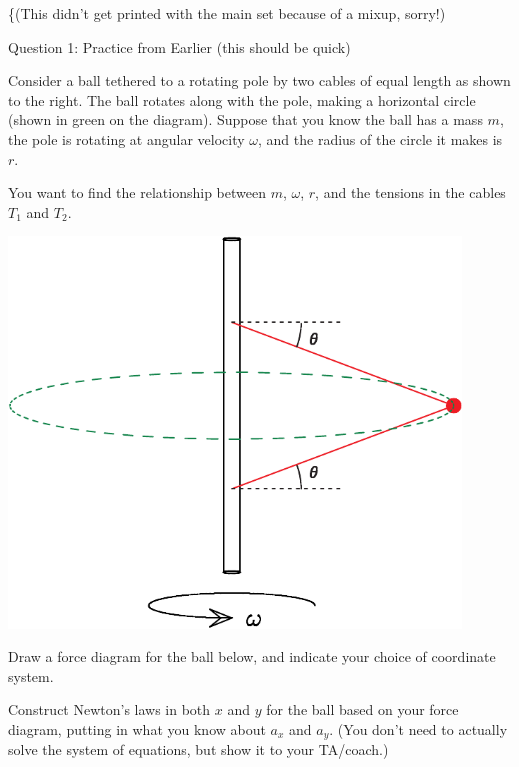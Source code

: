 \documentclass[12pt]{article}
\begin{document}
\Large
\centerline{}
\normalsize
\centerline{\{(This didn't get printed with the main set because of a mixup, sorry!)}

\medskip
\centerline{\Large Question 1: Practice from Earlier (this should be quick)}

\begin{minipage}{0.5\textwidth}
	Consider a ball tethered to a rotating pole by two cables of equal length as shown to the right. The ball rotates along with the pole, making a horizontal circle (shown in green on the diagram). Suppose that you know the ball has a mass $m$, the pole is rotating at angular velocity $\omega$, and the radius of the circle it makes is $r$.
	
	\bigskip
	
	You want to find the relationship between $m$, $\omega$, $r$, and the tensions in the cables $T_1$ and $T_2$.
	
\end{minipage}
\begin{minipage}{0.4\textwidth}
	\hspace{0.1\textwidth}
	\includegraphics[width=0.9\textwidth]{pole-crop.pdf}
\end{minipage}

Draw a force diagram for the ball below, and indicate your choice of coordinate system.
%

\vspace{3in}

Construct Newton's laws in both $x$ and $y$ for the ball based on your force diagram, putting in what you know about $a_x$ and $a_y$. (You don't need to actually solve the system of equations, but show it to your TA/coach.)
%
%
%
\end{document}
